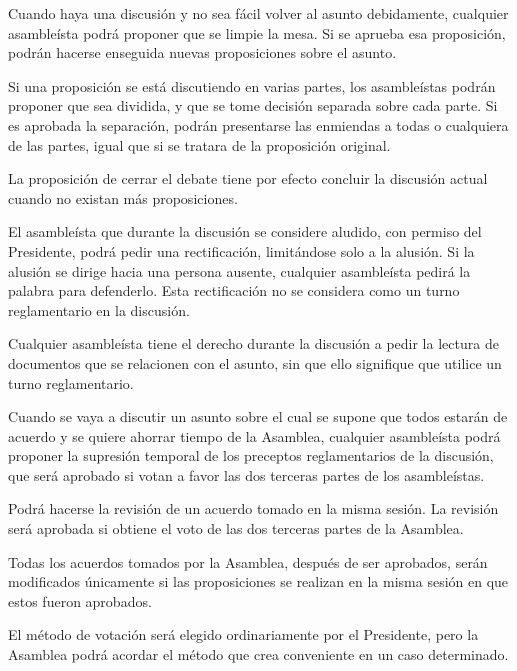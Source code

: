 \article
Cuando haya una discusión y no sea fácil volver al asunto debidamente, cualquier asambleísta podrá proponer que se limpie la mesa. Si se aprueba esa proposición, podrán hacerse enseguida nuevas proposiciones sobre el asunto.

\article
Si una proposición se está discutiendo en varias partes, los asambleístas podrán proponer que sea dividida, y que se tome decisión separada sobre cada parte. Si es aprobada la separación, podrán presentarse las enmiendas a todas o cualquiera de las partes, igual que si se tratara de la proposición original.

\article
La proposición de cerrar el debate tiene por efecto concluir la discusión actual cuando no existan más proposiciones.


\article
El asambleísta que durante la discusión se considere aludido, con permiso del Presidente, podrá pedir una rectificación, limitándose solo a la alusión. Si la alusión se dirige hacia una persona ausente, cualquier asambleísta pedirá la palabra para defenderlo. Esta rectificación no se considera como un turno reglamentario en la discusión.

\article
Cualquier asambleísta tiene el derecho durante la discusión a pedir la lectura de documentos que se relacionen con el asunto, sin que ello signifique que utilice un turno reglamentario.

\article
Cuando se vaya a discutir un asunto sobre el cual se supone que todos estarán de acuerdo y se quiere ahorrar tiempo de la Asamblea, cualquier asambleísta podrá proponer la supresión temporal de los preceptos reglamentarios de la discusión, que será aprobado si votan a favor las dos terceras partes de los asambleístas.

\article
Podrá hacerse la revisión de un acuerdo tomado en la misma sesión. La revisión será aprobada si obtiene el voto de las dos terceras partes de la Asamblea.

\article
Todas los acuerdos tomados por la Asamblea, después de ser aprobados, serán modificados únicamente si las proposiciones se realizan en la misma sesión en que estos fueron aprobados.


\article
El método de votación será elegido ordinariamente por el Presidente, pero la Asamblea podrá acordar el método que crea conveniente en un caso determinado.

